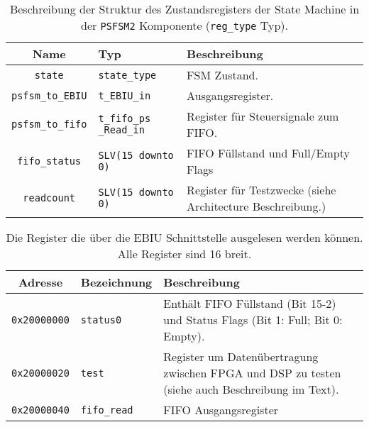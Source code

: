 \begin{table}[htbp]
    \ttabbox
    {
        \caption[Typdefinition PSFSM2 Zustandsregister]{Beschreibung der Struktur des Zustandsregisters der State Machine in der \lstinline$PSFSM2$ Komponente (\lstinline$reg_type$ Typ).}
        \label{Tab_reg_typ}
    }
    {
    \begin{tabular}{c  p{2cm} p{6cm}}
        \toprule
        Name				        & Typ						        & Beschreibung \\
        \midrule
        \lstinline$state$		    & \lstinline$state_type$	        & \gls{FSM} Zustand.\\
        \lstinline$psfsm_to_EBIU$	& \lstinline$t_EBIU_in$	            &  Ausgangsregister.\\
        \lstinline$psfsm_to_fifo$   & \lstinline$t_fifo_ps _Read_in$     & Register für Steuersignale zum FIFO.\\
        \lstinline$fifo_status$     & \lstinline$SLV(15 downto 0)$      & FIFO Füllstand und Full/Empty Flags\\
	    \lstinline$readcount$       & \lstinline$SLV(15 downto 0)$      & Register für Testzwecke (siehe Architecture Beschreibung.)\\
        \bottomrule
    \end{tabular}
}
\end{table}

\begin{table}[htbp]
    \ttabbox
    {
        \caption[Memory Map Rohdatenschnittstelle]{Die Register die über die EBIU Schnittstelle ausgelesen werden können. Alle Register sind \SI{16}{\bit} breit.}
        \label{Tab_RohdatenMemMap}
    }
    {
    \begin{tabular}{c  l p{6cm}}
        \toprule
        Adresse				    & Bezeichnung			& Beschreibung \\
        \midrule
        \lstinline$0x20000000$  & \lstinline$status0$   & Enthält FIFO Füllstand (Bit 15-2) und Status Flags (Bit 1: Full; Bit 0: Empty).\\
        \lstinline$0x20000020$  & \lstinline$test$      & Register um Datenübertragung zwischen FPGA und DSP zu testen (siehe auch Beschreibung im Text).\\
	    \lstinline$0x20000040$  & \lstinline$fifo_read$ & FIFO Ausgangsregister\\
        \bottomrule
    \end{tabular}
}
\end{table}

